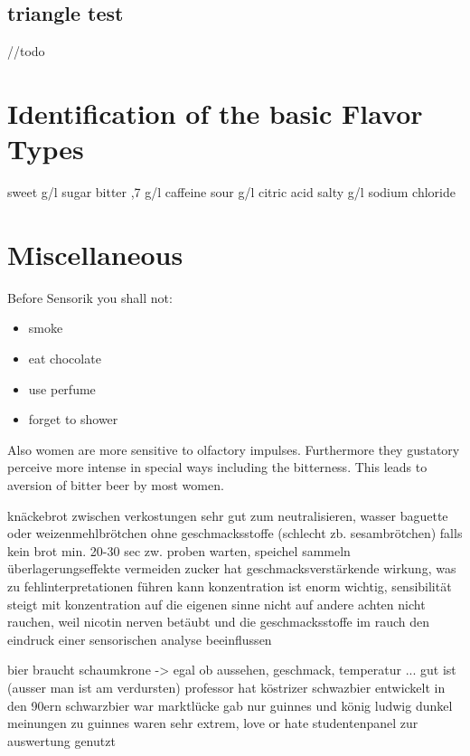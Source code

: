 \documentclass[]{scrartcl}
\begin{document}
\subsection{triangle test}
//todo


\section{Identification of the basic Flavor Types}
sweet  g/l sugar \newline
bitter ,7 g/l caffeine \newline
sour  g/l citric acid \newline
salty  g/l sodium chloride \newline


\newpage
\section{Miscellaneous}
Before Sensorik you shall not:
\begin{itemize}
  \item smoke
  \item eat chocolate
  \item use perfume
  \item forget to shower
\end{itemize}
Also women are more sensitive to olfactory impulses. Furthermore they gustatory perceive
more intense in special ways including the bitterness. This leads to aversion of bitter beer
by most women.

knäckebrot zwischen verkostungen sehr gut zum neutralisieren, wasser
baguette oder weizenmehlbrötchen ohne geschmacksstoffe (schlecht zb. sesambrötchen)
falls kein brot min. 20-30 sec zw. proben warten, speichel sammeln
überlagerungseffekte vermeiden
zucker hat geschmacksverstärkende wirkung, was zu fehlinterpretationen führen kann
konzentration ist enorm wichtig, sensibilität steigt mit konzentration auf die eigenen sinne
nicht auf andere achten
nicht rauchen, weil nicotin nerven betäubt und die geschmacksstoffe im rauch den
eindruck einer sensorischen analyse beeinflussen



bier braucht schaumkrone -> egal ob aussehen, geschmack, temperatur ... gut ist (ausser man ist am verdursten)
professor hat köstrizer schwazbier entwickelt in den 90ern
	schwarzbier war marktlücke
	gab nur guinnes und könig ludwig dunkel
		meinungen zu guinnes waren sehr extrem, love or hate
	studentenpanel zur auswertung genutzt
\end{document}
